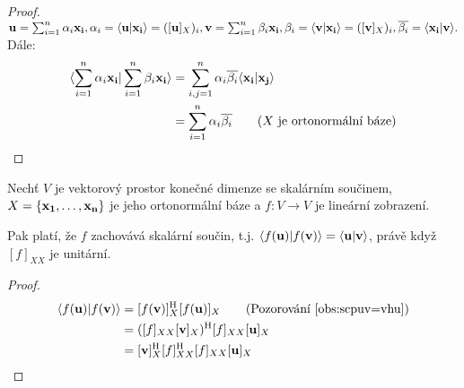 \begin{proof}
    $\mathbf{u} = \sum_{i=1}^n \alpha_i\mathbf{x_i}, \alpha_i=\langle \mathbf{u} | \mathbf{x_i} \rangle = ([\mathbf{u}]_X)_i,
    \mathbf{v} = \sum_{i=1}^n \beta_i\mathbf{x_i}, \beta_i=\langle \mathbf{v} | \mathbf{x_i} \rangle = ([\mathbf{v}]_X)_i,
    \overline{\beta_i} = \langle \mathbf{x_i} | \mathbf{v} \rangle.$ Dále:
    \begin{align*}
        \langle \sum_{i=1}^n \alpha_i\mathbf{x_i} | \sum_{i=1}^n \beta_i\mathbf{x_i} \rangle 
            &= \sum_{i,j=1}^n \alpha_i\overline{\beta_i} \langle \mathbf{x_i} | \mathbf{x_j} \rangle \\
            &= \sum_{i=1}^n \alpha_i \overline{\beta_i} \tag{$X$ je 
                ortonormální báze}
    \end{align*}
\end{proof}

\begin{proposition}
    Nechť $V$ je vektorový prostor konečné dimenze se skalárním součinem,
    $X = \{\mathbf{x_1}, \dots, \mathbf{x_n}\}$ je jeho ortonormální báze a $f: V 
    \rightarrow V$ je lineární zobrazení.

    Pak platí, že $f$ zachovává skalární součin, t.j. $\langle f(\mathbf{u}) | f(\mathbf{v}) \rangle 
    = \langle \mathbf{u} | \mathbf{v} \rangle$, právě když $[f]_{XX}$ je unitární.
\end{proposition}

\begin{proof}
    \begin{align*}
        \scp{f(\vu)}{f(\vv)} &= [f(\vv)]_X^\herm[f(\vu)]_X 
        \tag{Pozorování~\ref{obs:scpuv=vhu}} \\
                             &= ([f]_{XX}[\vv]_X)^\herm[f]_{XX}[\vu]_X \\
                             &= [\vv]_X^\herm[f]_{XX}^\herm[f]_{XX}[\vu]_X
    \end{align*}
\end{proof}

